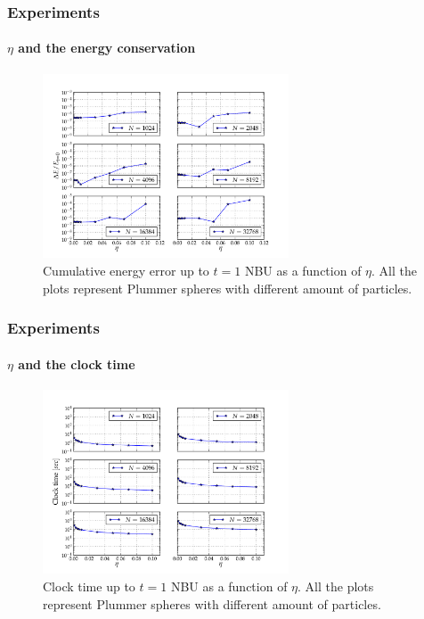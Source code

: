 \begin{frame}
    \frametitle{Experiments}
    \framesubtitle{$\eta$ and the energy conservation}

\begin{figure}[H]
    \centering
    \label{fig:eta_energy}
    \includegraphics[width=0.65\textwidth]{img/test_energy_eta_N.pdf}
    \caption{Cumulative energy error up to $t=1$ NBU as a function of $\eta$.
             All the plots represent Plummer spheres with  different
             amount of particles.}
\end{figure}

\end{frame}

\begin{frame}
    \frametitle{Experiments}
    \framesubtitle{$\eta$ and the clock time}

\begin{figure}[H]
    \centering
    \label{fig:eta_time}
    \includegraphics[width=0.65\textwidth]{img/test_time_eta_N.pdf}
    \caption{Clock time up to $t=1$ NBU as a function of $\eta$.
             All the plots represent Plummer spheres with  different
             amount of particles.}
\end{figure}

\end{frame}


